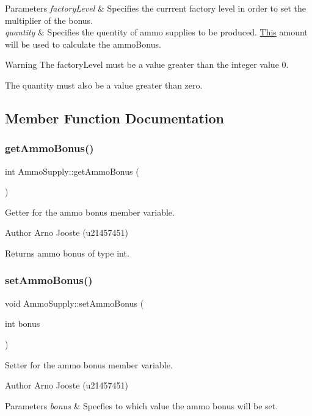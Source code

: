 \begin{DoxyParams}{Parameters}
{\em factory\+Level} & Specifies the currrent factory level in order to set the multiplier of the bonus. \\
\hline
{\em quantity} & Specifies the quentity of ammo supplies to be produced. \mbox{\hyperlink{class_this}{This}} amount will be used to calculate the ammo\+Bonus. \\
\hline
\end{DoxyParams}
\begin{DoxyWarning}{Warning}
The factory\+Level must be a value greater than the integer value 0. 

The quantity must also be a value greater than zero. 
\end{DoxyWarning}


\subsection{Member Function Documentation}
\mbox{\label{class_ammo_supply_a0bb29802e0d64f63d25c10d0cafa71f8}} 
\subsubsection{\texorpdfstring{getAmmoBonus()}{getAmmoBonus()}}
{\footnotesize\ttfamily int Ammo\+Supply\+::get\+Ammo\+Bonus (\begin{DoxyParamCaption}{ }\end{DoxyParamCaption})}



Getter for the ammo bonus member variable. 

\begin{DoxyAuthor}{Author}
Arno Jooste (u21457451) 
\end{DoxyAuthor}
\begin{DoxyReturn}{Returns}
ammo bonus of type int. 
\end{DoxyReturn}
\mbox{\label{class_ammo_supply_a39af493b4b03a58a57b347ebf61c8f73}} 
\subsubsection{\texorpdfstring{setAmmoBonus()}{setAmmoBonus()}}
{\footnotesize\ttfamily void Ammo\+Supply\+::set\+Ammo\+Bonus (\begin{DoxyParamCaption}\item[{int}]{bonus }\end{DoxyParamCaption})}



Setter for the ammo bonus member variable. 

\begin{DoxyAuthor}{Author}
Arno Jooste (u21457451) 
\end{DoxyAuthor}

\begin{DoxyParams}{Parameters}
{\em bonus} & Specfies to which value the ammo bonus will be set. \\
\hline
\end{DoxyParams}
